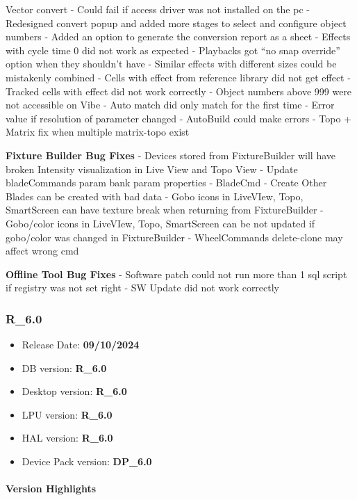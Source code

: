 \documentclass[
]{article}
\providecommand{\tightlist}{%
  \setlength{\itemsep}{0pt}\setlength{\parskip}{0pt}}
\begin{document}
Vector convert
- Could fail if access driver was not installed on the pc
- Redesigned convert popup and added more stages to select and configure object numbers
- Added an option to generate the conversion report as a sheet
- Effects with cycle time 0 did not work as expected
- Playbacks got ``no snap override'' option when they shouldn't have
- Similar effects with different sizes could be mistakenly combined
- Cells with effect from reference library did not get effect
- Tracked cells with effect did not work correctly
- Object numbers above 999 were not accessible on Vibe
- Auto match did only match for the first time
- Error value if resolution of parameter changed
- AutoBuild could make errors
- Topo + Matrix fix when multiple matrix-topo exist

\textbf{Fixture Builder Bug Fixes}
- Devices stored from FixtureBuilder will have broken Intensity visualization in Live View and Topo View
- Update bladeCommands param bank param properties
- BladeCmd - Create Other Blades can be created with bad data
- Gobo icons in LiveVIew, Topo, SmartScreen can have texture break when returning from FixtureBuilder
- Gobo/color icons in LiveVIew, Topo, SmartScreen can be not updated if gobo/color was changed in FixtureBuilder
- WheelCommands delete-clone may affect wrong cmd

\textbf{Offline Tool Bug Fixes}
- Software patch could not run more than 1 sql script if registry was not set right
- SW Update did not work correctly

\hypertarget{r_6.0}{%
\subsubsection{R\_6.0}\label{r_6.0}}

\begin{itemize}
\tightlist
\item
  Release Date: \textbf{09/10/2024}
\item
  DB version: \textbf{R\_6.0}
\item
  Desktop version: \textbf{R\_6.0}
\item
  LPU version: \textbf{R\_6.0}
\item
  HAL version: \textbf{R\_6.0}
\item
  Device Pack version: \textbf{DP\_6.0}
\end{itemize}

\hypertarget{version-highlights-1}{%
\paragraph{Version Highlights}\label{version-highlights-1}}
\end{document}
